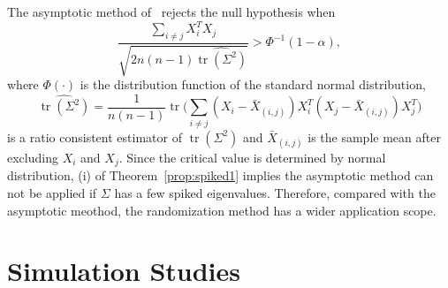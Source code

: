 \documentclass[3p]{elsarticle}
\DeclareMathOperator{\mytr}{tr}
\theoremstyle{plain}
\theoremstyle{definition}
\theoremstyle{remark}
\begin{document}

The asymptotic method of~\citet{Chen2010A} rejects the null hypothesis when
\begin{equation*}
\frac{\sum_{i\neq j}X_i^T X_j}{\sqrt{2n(n-1)\widehat{\mytr(\Sigma^2)}}}>\Phi^{-1}(1-\alpha),
\end{equation*}
where $\Phi(\cdot)$ is the distribution function of the standard normal distribution,
 \begin{equation*}
 \widehat{\mytr(\Sigma^2)}=\frac{1}{n(n-1)}\mytr\Big(\sum_{i\neq j}(X_i-\bar{X}_{(i,j)})X_i^T (X_j-\bar{X}_{(i,j)})X_j^T\Big)
 \end{equation*}
is a ratio consistent estimator of $\mytr(\Sigma^2)$ and $\bar{X}_{(i,j)}$ is the sample mean after excluding $X_i$ and $X_j$.
Since the critical value is determined by normal distribution, (i) of Theorem~\ref{prop:spiked1} implies the asymptotic method can not be applied if $\Sigma$ has a few spiked eigenvalues.
Therefore, compared with the asymptotic meothod, the randomization method has a wider application scope.


\section{Simulation Studies}
\end{document}
